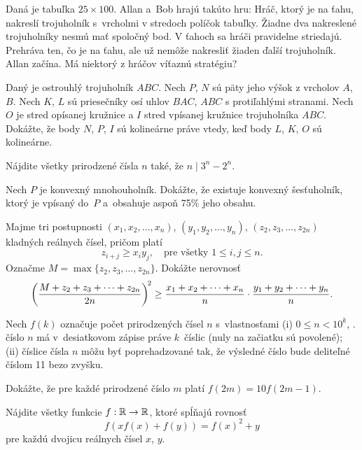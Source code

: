 {%
Daná je tabuľka $25\times 100$. Allan a~Bob hrajú takúto hru: Hráč, ktorý je na ťahu, nakreslí
trojuholník s~vrcholmi v stredoch políčok tabuľky. Žiadne dva nakreslené trojuholníky nesmú mať spoločný
bod. V ťahoch sa hráči pravidelne striedajú. Prehráva ten, čo je na ťahu, ale už nemôže nakresliť žiaden
ďalší trojuholník. Allan začína.
Má niektorý z hráčov víťaznú stratégiu?}

{%
Daný je ostrouhlý trojuholník $ABC$. Nech $P$, $N$ sú päty jeho výšok z vrcholov $A$, $B$.
Nech $K$, $L$ sú priesečníky osí uhlov $BAC$, $ABC$ s protiľahlými stranami. Nech $O$ je
stred opísanej kružnice a $I$ stred vpísanej kružnice trojuholníka $ABC$.
Dokážte, že body $N$, $P$, $I$ sú kolineárne práve vtedy, keď body $L$, $K$, $O$ sú kolineárne.}

{%
Nájdite všetky prirodzené čísla $n$ také, že $n\mid 3^n-2^n$.}

{%
Nech $P$ je konvexný mnohouholník. Dokážte,
že existuje konvexný šesťuholník, ktorý je vpísaný
do~$P$ a~obsahuje aspoň 75$\%$ jeho obsahu.}

{%
Majme tri postupnosti $(x_1,x_2,\dots,x_n)$,
$(y_1,y_2,\dots,y_n)$, $(z_2,z_3,\dots,z_{2n})$
kladných reálnych čísel, pričom platí
$$
z_{i+j}\ge x_iy_j,\quad\text{pre všetky }1\le i, j\le n.
$$
Označme $M=\max\{z_2,z_3,\dots,z_{2n}\}$. Dokážte nerovnosť
$$
\left({M+z_2+z_3+\cdots+z_{2n}}\over{2n}\right)^{\!2}\ge
{x_1+x_2+\cdots+x_n \over n}
\cdot{y_1+y_2+\cdots+y_n \over n}.
$$}

{%
Nech $f(k)$ označuje počet prirodzených čísel $n$ s~vlastnosťami
\ite (i) $0\le n<10^k$, \tj. číslo $n$ má v~desiatkovom zápise práve $k$~číslic (nuly na začiatku sú povolené);
\ite (ii) číslice čísla $n$ môžu byť poprehadzované tak, že výsledné číslo bude deliteľné číslom 11 bezo zvyšku.

Dokážte, že pre každé prirodzené číslo $m$ platí
$f(2m)=10f(2m-1)$.}

{%
Nájdite všetky funkcie $f:\Bbb R\to\Bbb R$, ktoré spĺňajú rovnosť
$$
f(xf(x)+f(y)) = f(x)^2 + y
$$
pre každú dvojicu reálnych čísel $x$, $y$.}

